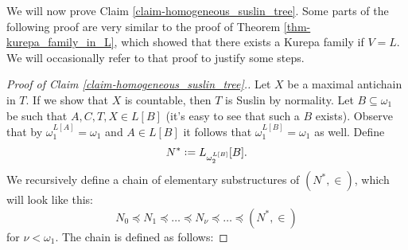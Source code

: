 \documentclass[11pt,a4paper]{report}
\theoremstyle{definition}
\theoremstyle{num.custom-title}
\theoremstyle{custom-title}
\DeclareMathOperator{\sse}{\subseteq}
\newcommand*{\defeq}{\mathrel{\rlap{%
                     \raisebox{0.3ex}{$\cdot$}}%
                     \raisebox{-0.3ex}{$\cdot$}}%
                     =}
\begin{document}
We will now prove Claim \ref{claim-homogeneous_suslin_tree}. Some parts of the following proof are very similar to the proof of Theorem \ref{thm-kurepa_family_in_L}, which showed that there exists a Kurepa family if $V=L$. We will occasionally refer to that proof to justify some steps.

\begin{proof}[Proof of Claim \ref{claim-homogeneous_suslin_tree}.]
Let $X$ be a maximal antichain in $T$. If we show that $X$ is countable, then $T$ is Suslin by normality. Let $B \sse \omega_1$ be such that $A,C,T,X \in L[B]$ (it's easy to see that such a $B$ exists). Observe that by $\omega_1^{L[A]} = \omega_1$ and $A \in L[B]$ it follows that $\omega_1^{L[B]}=\omega_1$ as well. Define
\[
N^* \defeq L_{\omega_2^{L[B]}}[B].
\]
We recursively define a chain of elementary substructures of $(N^*,\in)$, which will look like this:
\[
N_0 \preceq N_1 \preceq \dots \preceq N_\nu \preceq \dots \preceq (N^*,\in)
\]
for $\nu < \omega_1$. The chain is defined as follows: 


\end{proof}
\end{document}
